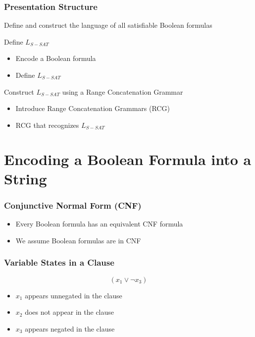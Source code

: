 \documentclass{beamer}
\begin{document}
\begin{frame}
    \frametitle{Presentation Structure}

    Define and construct the language of all satisfiable Boolean formulas

    \begin{block}{Define $L_{S-SAT}$}
        \begin{itemize}
            \item Encode a Boolean formula
            \item Define $L_{S-SAT}$
        \end{itemize}
    \end{block}


    \begin{block}{Construct $L_{S-SAT}$ using a Range Concatenation Grammar}
        \begin{itemize}
            \item Introduce Range Concatenation Grammars (RCG)
            \item RCG that recognizes $L_{S-SAT}$
        \end{itemize}
    \end{block}
\end{frame}

\section{Encoding a Boolean Formula into a String}

\begin{frame}
    \frametitle{Conjunctive Normal Form (CNF)}

    \begin{itemize}
        \item Every Boolean formula has an equivalent CNF formula
              \pause
        \item We assume Boolean formulas are in CNF
    \end{itemize}
\end{frame}

\begin{frame}
    \frametitle{Variable States in a Clause}

    \begin{Large}
        $$(x_1\vee \neg x_3)$$
    \end{Large}

    \pause
    \vspace{1cm}
    \begin{itemize}
        \item<1-> $x_1$ appears unnegated in the clause
        \item<3-> $x_2$ does not appear in the clause
        \item<2-> $x_3$ appears negated in the clause
    \end{itemize}
\end{frame}
\end{document}
